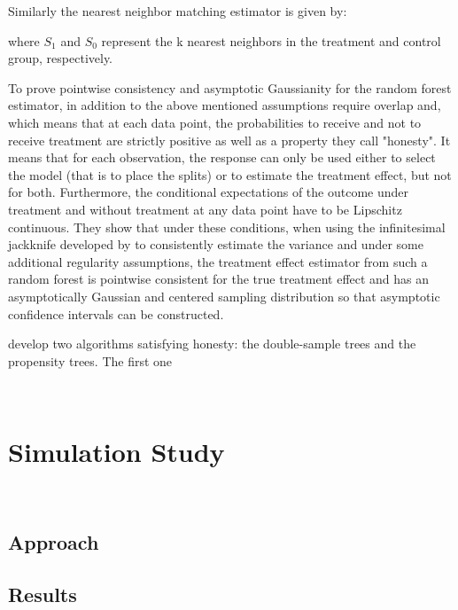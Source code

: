 \documentclass[11pt, a4paper, leqno]{article}
\begin{document}
Similarly the nearest neighbor matching estimator is given by: 

where \(S_1\) and \(S_0\) represent the k nearest neighbors in the treatment and control group, respectively.   

To prove pointwise consistency and asymptotic Gaussianity for the random forest estimator, in addition to the above mentioned assumptions \cite{wa18} require overlap and, which means that at each data point, the probabilities to receive and not to receive treatment are strictly positive as well as a property they call "honesty". It means that for each observation, the response can only be used either to select the model (that is to place the splits) or to estimate the treatment effect, but not for both. Furthermore, the conditional expectations of the outcome under treatment and without treatment at any data point have to be Lipschitz continuous.
They show that under these conditions, when using the infinitesimal jackknife developed by \cite{e14} to consistently estimate the variance and under some additional regularity assumptions, the treatment effect estimator from such a random forest is pointwise consistent for the true treatment effect and has an asymptotically Gaussian and centered sampling distribution so that asymptotic confidence intervals can be constructed. 

\cite{wa18} develop two algorithms satisfying honesty: the double-sample trees and the propensity trees. The first one 



\(\) \(\) 


\section{Simulation Study} %
\label{sec:simulation}



 \(\) \(\) \(\) \(\) \(\) {}



\subsection{Approach} %
\label{sec:sim_approach}



\subsection{Results} %
\label{sec:sim_results}
    
\end{document}
